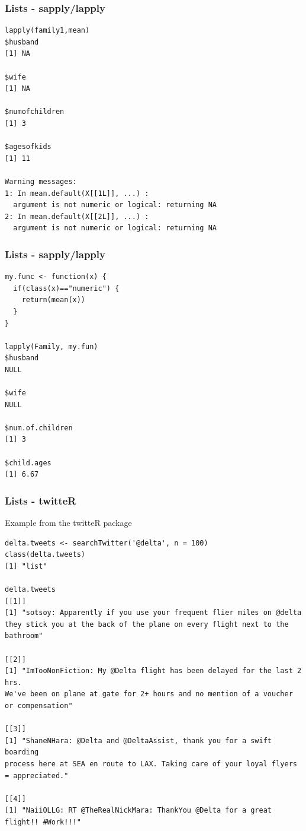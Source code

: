 \documentclass{beamer}
\begin{document}
\begin{frame}[fragile]
\frametitle{Lists - sapply/lapply}
\footnotesize
\begin{verbatim}
lapply(family1,mean)
$husband
[1] NA

$wife
[1] NA

$numofchildren
[1] 3

$agesofkids
[1] 11

Warning messages:
1: In mean.default(X[[1L]], ...) :
  argument is not numeric or logical: returning NA
2: In mean.default(X[[2L]], ...) :
  argument is not numeric or logical: returning NA

\end{verbatim}
\end{frame}

%
\begin{frame}[fragile]
\frametitle{Lists - sapply/lapply}
\footnotesize
\begin{verbatim}
my.func <- function(x) {
  if(class(x)=="numeric") {
    return(mean(x))
  }
}

lapply(Family, my.fun)
$husband
NULL

$wife
NULL

$num.of.children
[1] 3

$child.ages
[1] 6.67

\end{verbatim}
\end{frame}

%

\begin{frame}[fragile]
\frametitle{Lists - twitteR}
Example from the twitteR package
\scriptsize
\begin{verbatim}
delta.tweets <- searchTwitter('@delta', n = 100)  
class(delta.tweets)
[1] "list"

delta.tweets
[[1]]
[1] "sotsoy: Apparently if you use your frequent flier miles on @delta 
they stick you at the back of the plane on every flight next to the bathroom"

[[2]]
[1] "ImTooNonFiction: My @Delta flight has been delayed for the last 2 hrs. 
We've been on plane at gate for 2+ hours and no mention of a voucher 
or compensation"

[[3]]
[1] "ShaneNHara: @Delta and @DeltaAssist, thank you for a swift boarding 
process here at SEA en route to LAX. Taking care of your loyal flyers 
= appreciated."

[[4]]
[1] "NaiiOLLG: RT @TheRealNickMara: ThankYou @Delta for a great flight!! #Work!!!"

\end{verbatim}
\end{frame}
\end{document}
